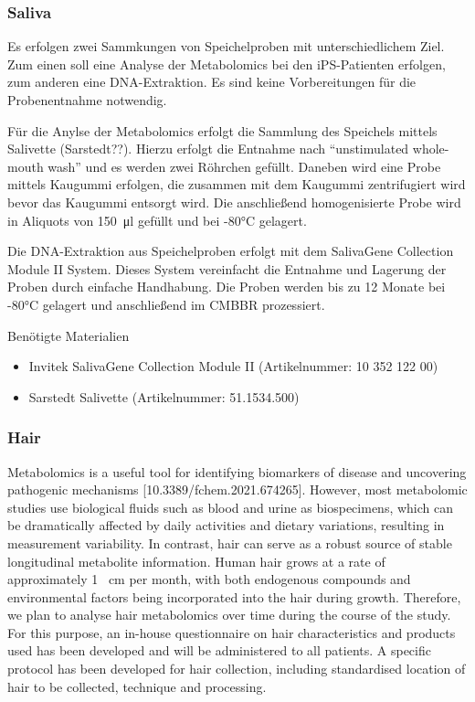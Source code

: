 \subsubsection{Saliva}
\label{biosamples:saliva}
Es erfolgen zwei Sammkungen von Speichelproben mit unterschiedlichem Ziel. Zum einen soll eine Analyse der Metabolomics bei den \ac{iPS}-Patienten erfolgen, zum anderen eine DNA-Extraktion. Es sind keine Vorbereitungen für die Probenentnahme notwendig.

Für die Anylse der Metabolomics erfolgt die Sammlung des Speichels mittels Salivette (Sarstedt??). Hierzu erfolgt die Entnahme nach ``unstimulated whole-mouth wash'' und es werden zwei Röhrchen gefüllt. Daneben wird eine Probe mittels Kaugummi erfolgen, die zusammen mit dem Kaugummi zentrifugiert wird bevor das Kaugummi entsorgt wird.  Die anschließend homogenisierte Probe wird in Aliquots von  \SI{150}{\micro\litre} gefüllt und bei -80°C gelagert.

Die DNA-Extraktion aus Speichelproben erfolgt mit dem SalivaGene Collection Module II System. Dieses System vereinfacht die Entnahme und Lagerung der Proben durch einfache Handhabung. Die Proben werden bis zu 12 Monate bei -80°C gelagert und anschließend im CMBBR prozessiert. 

Benötigte Materialien
\begin{itemize}
\item Invitek SalivaGene Collection Module II (Artikelnummer: 10 352 122 00)
\item Sarstedt Salivette (Artikelnummer: 51.1534.500)

\end{itemize}

\subsubsection{Hair}
\label{biosamples:hair}
Metabolomics is a useful tool for identifying biomarkers of disease and uncovering pathogenic mechanisms [10.3389/fchem.2021.674265]. However, most metabolomic studies use biological fluids such as blood and urine as biospecimens, which can be dramatically affected by daily activities and dietary variations, resulting in measurement variability. In contrast, hair can serve as a robust source of stable longitudinal metabolite information. Human hair grows at a rate of approximately \num{1} \SI{}{\centi\metre} per month, with both endogenous compounds and environmental factors being incorporated into the hair during growth. Therefore, we plan to analyse hair metabolomics over time during the course of the study. For this purpose, an in-house questionnaire on hair characteristics and products used has been developed and will be administered to all patients. A specific protocol has been developed for hair collection, including standardised location of hair to be collected, technique and processing. 

